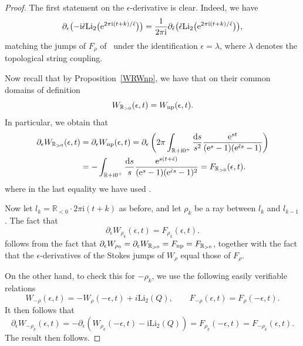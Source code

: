 \documentclass[pdftex]{sigma}
\numberwithin{equation}{section}
\begin{document}
\begin{proof}
The first statement on the $\epsilon$-derivative is clear. Indeed, we have
\begin{equation*}
 \partial_{\epsilon}\bigl(-\mathrm{i} \check{\epsilon} \mathrm{Li}_2\big({\rm e}^{2\pi \mathrm{i}(t+k)/\check \epsilon}\big)\bigr)=\frac{1}{2\pi \mathrm{i}}\partial_{\check{\epsilon}}\big( \check{\epsilon} \mathrm{Li}_2\big({\rm e}^{2\pi \mathrm{i}(t+k)/\check \epsilon}\big)\big),
\end{equation*}
matching the jumps of $F_{\rho}$ of~\cite{ASTT21} under the identification $\epsilon=\lambda$, where $\lambda$ denotes the topological string coupling.

Now recall that by Proposition~\ref{WRWnp}, we have that on their common domains of definition
\begin{equation*}
 W_{\mathbb{R}_{>0}}(\epsilon,t)= W_{{\rm np}}(\epsilon,t).
\end{equation*}
In particular, we obtain that
\begin{align*}
 \partial_{\epsilon}W_{\mathbb{R}_{>0}}(\epsilon,t)&=\partial_{\epsilon}W_{{\rm np}}(\epsilon,t)
 =\partial_{\epsilon}\left(2\pi \int_{\mathbb{R}+\mathrm i0^+} \frac{{\rm d}s}{s^2}\frac{{\rm e}^{s t}}{({\rm e}^s-1)({\rm e}^{\check{\epsilon}s}-1)}\right)\\
 &=-\int_{\mathbb{R}+\mathrm i0^+} \frac{{\rm d}s}{s}\frac{{\rm e}^{s (t+\check\epsilon)}}{({\rm e}^s-1)({\rm e}^{\check{\epsilon}s}-1)^2}=F_{\mathbb{R}_{>0}}(\epsilon,t).
 \end{align*}
where in the last equality we have used \cite[Theorem~2]{ASTT21}.

Now let $l_k=\mathbb{R}_{<0}\cdot 2\pi \mathrm{i}(t+k)$ as before, and let $\rho_k$ be a ray between $l_k$ and $l_{k-1}$. The fact that
\begin{equation*}
 \partial_{\epsilon}W_{\rho_k}(\epsilon,t)=F_{\rho_k}(\epsilon,t).
\end{equation*}
follows from the fact that $\partial_{\epsilon}W_{\rho_0}=\partial_{\epsilon}W_{\mathbb{R}_{>0}}=F_{{\rm np}}=F_{\mathbb{R}_{>0}}$, together with the fact that the $\epsilon$-derivatives of the Stokes jumps of $W_{\rho}$ equal those of $F_{\rho}$.

On the other hand, to check this for $-\rho_k$, we use the following easily verifiable relations
\begin{equation*}
 W_{-\rho}(\epsilon,t)=-W_{\rho}(-\epsilon,t)+i\mathrm{Li}_2(Q), \qquad F_{-\rho}(\epsilon,t)=F_{\rho}(-\epsilon,t).
\end{equation*}
It then follows that
\begin{equation*}
 \partial_{\epsilon}W_{-\rho_k}(\epsilon,t)=-\partial_{\epsilon}(W_{\rho_k}(-\epsilon,t)-\mathrm{i}\mathrm{Li}_2(Q))=F_{\rho_k}(-\epsilon,t)=F_{-\rho_k}(\epsilon,t).
\end{equation*}
The result then follows.
\end{proof}
\end{document}
